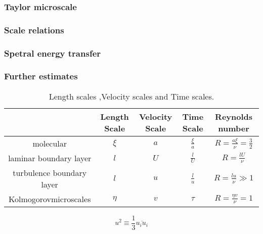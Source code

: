 \documentclass[review]{elsarticle}
\begin{document}
		\subsubsection{Taylor microscale}
		\subsubsection{Scale relations}
		\subsubsection{Spetral energy transfer}
		\subsubsection{Further estimates}
	
	
	
	
	
	
\newpage
{}	
\begin {center}
	\begin{table}[!htb]
		\centering
		\begin{tabular}{|c|c|c|c|c|}
			\hline
		 	& Length Scale& Velocity Scale & Time Scale & Reynolds number\\
			\hline
			molecular & $\xi$ & $a$ & $\frac{\xi}{a}$ & $R=\frac{a\xi}{\nu}=\frac{3}{2}$\\
			\hline
			laminar boundary layer & $l$ & $U$ & $\frac{l}{U}$ & $R=\frac{lU}{\nu}$ \\
			\hline
			turbulence boundary layer & $l$ & $u$ & $\frac{l}{u}$ & $R=\frac{lu}{\nu}\gg 1$\\
			\hline
			Kolmogorovmicroscales & $\eta$ & $v$ & $\tau$ & $R=\frac{\eta v}{\nu}=1$\\
			\hline
		\end{tabular}
		\caption{\label{scales} Length scales ,Velocity scales and Time scales.}
	\end{table}
\end{center}

	\begin{equation}
		u^2 \equiv \frac{1}{3}\overline{u_iu_i}
	\end{equation}
\end{document}
